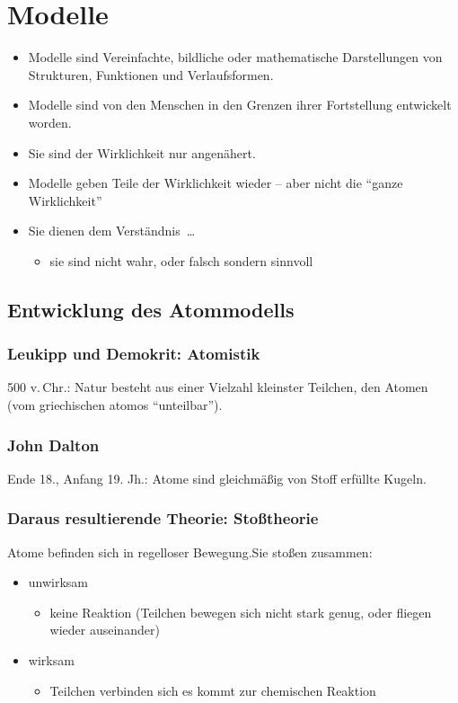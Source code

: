 \section{Modelle}
\begin{itemize}
\item Modelle sind Vereinfachte, bildliche oder mathematische Darstellungen von Strukturen, Funktionen und Verlaufsformen.
\item Modelle sind von den Menschen in den Grenzen ihrer Fortstellung entwickelt worden.
\item Sie sind der Wirklichkeit nur angenähert.
\item Modelle geben Teile der Wirklichkeit wieder -- aber nicht die \enquote{ganze Wirklichkeit}
\item Sie dienen dem Verständnis~\dots
\begin{itemize}
\item sie sind nicht wahr, oder falsch sondern sinnvoll
\end{itemize}
\end{itemize}
\subsection{Entwicklung des Atommodells}
\subsubsection{Leukipp und Demokrit: Atomistik}
500 v.\,Chr.: Natur besteht aus einer Vielzahl kleinster Teilchen, den Atomen
(vom griechischen atomos \enquote{unteilbar}).

\subsubsection{John Dalton}
Ende 18., Anfang 19. Jh.: Atome sind gleichmäßig von Stoff erfüllte Kugeln.

\subsubsection{Daraus resultierende Theorie: Stoßtheorie}
Atome befinden sich in regelloser Bewegung.\newline Sie stoßen zusammen:
\begin{itemize}
\item unwirksam\begin{itemize}
\item keine Reaktion (Teilchen bewegen sich nicht stark genug, oder fliegen wieder auseinander)
\end{itemize}
\item wirksam\begin{itemize}
\item Teilchen verbinden sich es kommt zur chemischen Reaktion
\end{itemize}\end{itemize}

